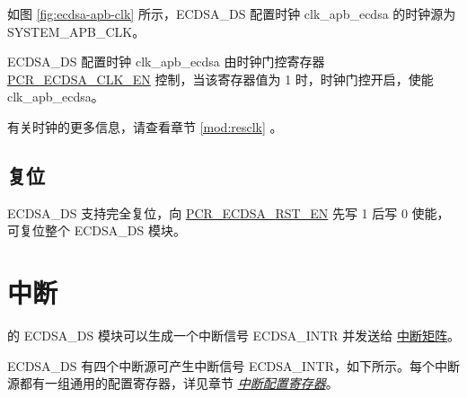 \documentclass[main\_\_CN.tex]{subfiles}
\begin{document}
如图 \ref{fig:ecdsa-apb-clk} \textit{} 所示，ECDSA\_DS 配置时钟 clk\_apb\_ecdsa 的时钟源为 SYSTEM\_APB\_CLK。

ECDSA\_DS 配置时钟 clk\_apb\_ecdsa 由时钟门控寄存器 \hyperref[fielddesc:PCRECDSACLKEN]{PCR\_ECDSA\_CLK\_EN} 控制，当该寄存器值为 1 时，时钟门控开启，使能 clk\_apb\_ecdsa。

有关时钟的更多信息，请查看章节 \ref{mod:resclk} \textit{}。

\subsection{复位}

ECDSA\_DS 支持完全复位，向 \hyperref[fielddesc:PCRECDSARSTEN]{PCR\_ECDSA\_RST\_EN} 先写 1 后写 0 使能，可复位整个 ECDSA\_DS 模块。

\section{中断}
\label{sec:ecdsa-interrupt}

\chipname{} 的 ECDSA\_DS 模块可以生成一个中断信号 ECDSA\_INTR 并发送给 \hyperref[mod:intmtrx]{中断矩阵}。

ECDSA\_DS 有四个中断源可产生中断信号 ECDSA\_INTR，如下所示。每个中断源都有一组通用的配置寄存器，详见章节 \hyperref[interrupt-config-registers]{\textit{中断配置寄存器}}。
\end{document}

